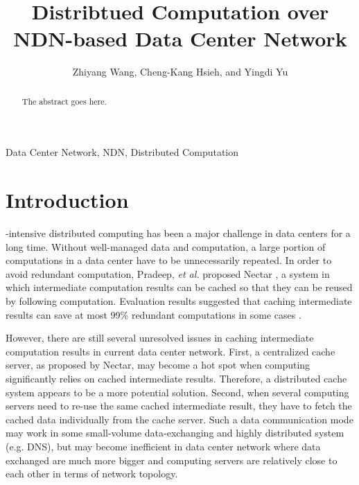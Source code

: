 \documentclass[journal]{IEEEtran}
\begin{document}
\title{Distribtued Computation over NDN-based Data Center Network}

\author{Zhiyang Wang,
        Cheng-Kang Hsieh,
        and Yingdi Yu}

\maketitle

\begin{abstract}
The abstract goes here.
\end{abstract}

\begin{IEEEkeywords}
Data Center Network, NDN, Distributed Computation
\end{IEEEkeywords}

\IEEEpeerreviewmaketitle



\section{Introduction}
-intensive distributed computing has been a major challenge
in data centers for a long time.  Without well-managed data and computation, a
large portion of computations in a data center have to be unnecessarily
repeated.  In order to avoid redundant computation, Pradeep, {\it et al.}
proposed Nectar \cite{gunda2010nectar}, a system in which intermediate computation
results can be cached so that they can be reused by following computation.
Evaluation results suggested that caching intermediate results can save at most
99\% redundant computations in some cases \cite{gunda2010nectar}.

However, there are still several unresolved issues in caching intermediate
computation results in current data center network.  First, a centralized cache
server, as proposed by Nectar, may become a hot spot when computing
significantly relies on cached intermediate results.  Therefore, a distributed
cache system appears to be a more potential solution.  Second, when several
computing servers need to re-use the same cached intermediate result, they have
to fetch the cached data individually from the cache server.  Such a data
communication mode may work in some small-volume data-exchanging and highly
distributed system (e.g. DNS), but may become inefficient in data center
network where data exchanged are much more bigger and computing servers are
relatively close to each other in terms of network topology.  
\end{document}
